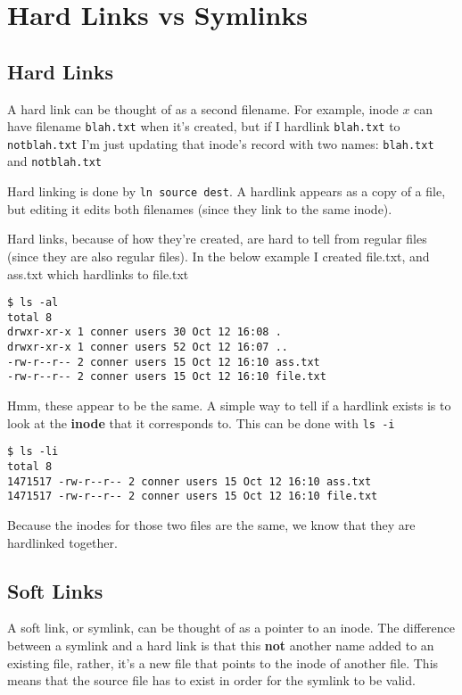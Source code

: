 
\section{Hard Links vs Symlinks}

\subsection{Hard Links}
A hard link can be thought of as a second filename. For example, inode $x$ can
have filename \texttt{blah.txt} when it's created, but if I hardlink
\texttt{blah.txt} to \texttt{notblah.txt} I'm just updating that inode's record
with two names: \texttt{blah.txt} and \texttt{notblah.txt}

Hard linking is done by \texttt{ln source dest}. A hardlink appears as a
copy of a file, but editing it edits both filenames (since they link to the same
inode).

Hard links, because of how they're created, are hard to tell from regular files
(since they are also regular files). In the below example I created file.txt,
and ass.txt which hardlinks to file.txt

\begin{verbatim}
$ ls -al
total 8
drwxr-xr-x 1 conner users 30 Oct 12 16:08 .
drwxr-xr-x 1 conner users 52 Oct 12 16:07 ..
-rw-r--r-- 2 conner users 15 Oct 12 16:10 ass.txt
-rw-r--r-- 2 conner users 15 Oct 12 16:10 file.txt
\end{verbatim}

Hmm, these appear to be the same. A simple way to tell if a hardlink exists is
to look at the \textbf{inode} that it corresponds to. This can be done with
\texttt{ls -i} 

\begin{verbatim}
$ ls -li
total 8
1471517 -rw-r--r-- 2 conner users 15 Oct 12 16:10 ass.txt
1471517 -rw-r--r-- 2 conner users 15 Oct 12 16:10 file.txt
\end{verbatim}
Because the inodes for those two files are the same, we know that they are
hardlinked together.

\subsection{Soft Links}
A soft link, or symlink, can be thought of as a pointer to an inode. The
difference between a symlink and a hard link is that this \textbf{not} another
name added to an existing file, rather, it's a new file that points to the inode
of another file. This means that the source file has to exist in order for the
symlink to be valid.


